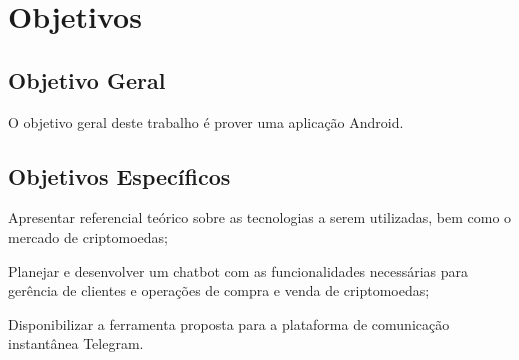 
\section{Objetivos}
\subsection{Objetivo Geral}
O objetivo geral deste trabalho é prover uma aplicação Android.

\subsection{Objetivos Específicos}
\begin{lista}
  \item Apresentar referencial teórico sobre as tecnologias a serem utilizadas, bem como o mercado de criptomoedas;
  \item Planejar e desenvolver um chatbot com as funcionalidades necessárias para gerência de clientes e operações de compra e venda de criptomoedas;
  \item Disponibilizar a ferramenta proposta para a plataforma de comunicação instantânea Telegram.
\end{lista}